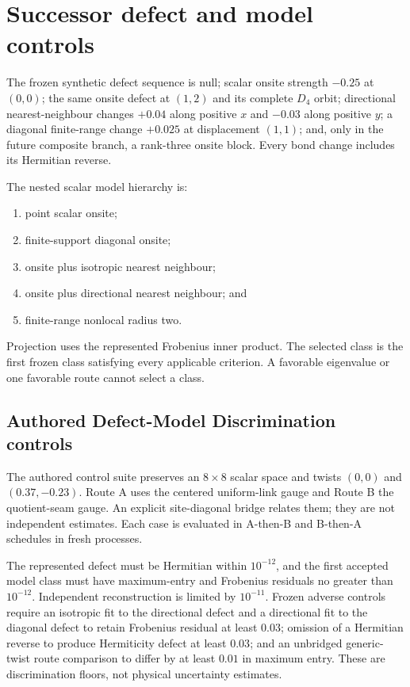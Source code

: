 \documentclass[11pt]{article}
\begin{document}
\section{Successor defect and model controls}

The frozen synthetic defect sequence is null; scalar onsite strength $-0.25$ at $(0,0)$;
the same onsite defect at $(1,2)$ and its complete $D_4$ orbit; directional
nearest-neighbour changes $+0.04$ along positive $x$ and $-0.03$ along positive $y$; a
diagonal finite-range change $+0.025$ at displacement $(1,1)$; and, only in the future
composite branch, a rank-three onsite block.  Every bond change includes its Hermitian
reverse.

The nested scalar model hierarchy is:
\begin{enumerate}[leftmargin=*]
  \item point scalar onsite;
  \item finite-support diagonal onsite;
  \item onsite plus isotropic nearest neighbour;
  \item onsite plus directional nearest neighbour; and
  \item finite-range nonlocal radius two.
\end{enumerate}
Projection uses the represented Frobenius inner product.  The selected class is the
first frozen class satisfying every applicable criterion.  A favorable eigenvalue or
one favorable route cannot select a class.

\subsection{Authored Defect-Model Discrimination controls}

The authored control suite preserves an $8\times8$ scalar space and twists $(0,0)$ and
$(0.37,-0.23)$.  Route A uses the centered uniform-link gauge and Route B the
quotient-seam gauge.  An explicit site-diagonal bridge relates them; they are not
independent estimates.  Each case is evaluated in A-then-B and B-then-A schedules in
fresh processes.

The represented defect must be Hermitian within $10^{-12}$, and the first accepted
model class must have maximum-entry and Frobenius residuals no greater than $10^{-12}$.
Independent reconstruction is limited by $10^{-11}$.  Frozen adverse controls require
an isotropic fit to the directional defect and a directional fit to the diagonal defect
to retain Frobenius residual at least $0.03$; omission of a Hermitian reverse to produce
Hermiticity defect at least $0.03$; and an unbridged generic-twist route comparison to
differ by at least $0.01$ in maximum entry.  These are discrimination floors, not
physical uncertainty estimates.
\end{document}
